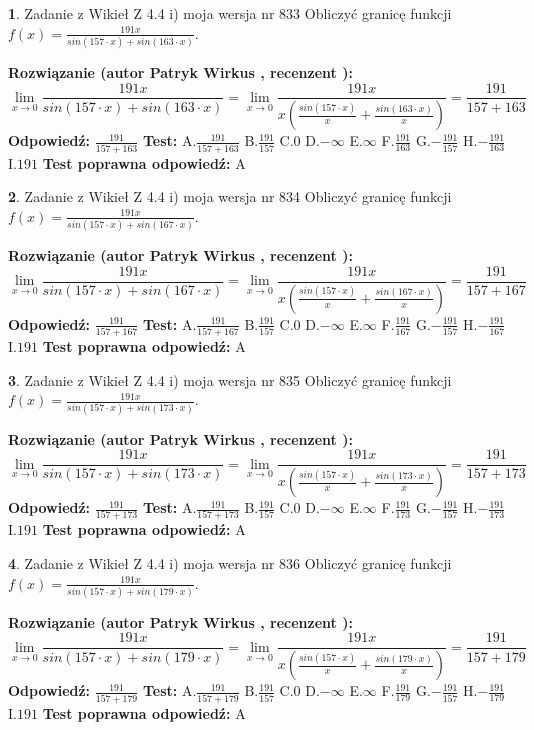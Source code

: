 \documentclass[12pt, a4paper]{article}
\theoremstyle{definition} %
\newtheorem{zad}{}
\newcommand{\zadStart}[1]{\begin{zad}#1\newline}
\newcommand{\zadStop}{\end{zad}}
\newcommand{\rozwStart}[2]{\noindent \textbf{Rozwiązanie (autor #1 , recenzent #2): }\newline}
\newcommand{\rozwStop}{\newline}
\newcommand{\odpStart}{\noindent \textbf{Odpowiedź:}\newline}
\newcommand{\odpStop}{\newline}
\newcommand{\testStart}{\noindent \textbf{Test:}\newline}
\newcommand{\testStop}{\newline}
\newcommand{\kluczStart}{\noindent \textbf{Test poprawna odpowiedź:}\newline}
\newcommand{\kluczStop}{\newline}
\begin{document}
\zadStart{Zadanie z Wikieł Z 4.4 i) moja wersja nr 833}
Obliczyć granicę funkcji $f(x)=\frac{191x}{sin(157\cdot x) +sin(163\cdot x)}$.
\zadStop
\rozwStart{Patryk Wirkus}{}
$$\lim\limits_{x\to 0}\frac{191x}{sin(157\cdot x) +sin(163\cdot x)}=\lim\limits_{x\to 0}\frac{191x}{x(\frac{sin(157\cdot x)}{x}+\frac{sin(163\cdot x)}{x})}=\frac{191}{157+163}$$
\rozwStop
\odpStart
$\frac{191}{157+163}$
\odpStop
\testStart
A.$\frac{191}{157+163}$
B.$\frac{191}{157}$
C.$0$
D.$-\infty$
E.$\infty$
F.$\frac{191}{163}$
G.$-\frac{191}{157}$
H.$-\frac{191}{163}$
I.$191$
\testStop
\kluczStart
A
\kluczStop



\zadStart{Zadanie z Wikieł Z 4.4 i) moja wersja nr 834}
Obliczyć granicę funkcji $f(x)=\frac{191x}{sin(157\cdot x) +sin(167\cdot x)}$.
\zadStop
\rozwStart{Patryk Wirkus}{}
$$\lim\limits_{x\to 0}\frac{191x}{sin(157\cdot x) +sin(167\cdot x)}=\lim\limits_{x\to 0}\frac{191x}{x(\frac{sin(157\cdot x)}{x}+\frac{sin(167\cdot x)}{x})}=\frac{191}{157+167}$$
\rozwStop
\odpStart
$\frac{191}{157+167}$
\odpStop
\testStart
A.$\frac{191}{157+167}$
B.$\frac{191}{157}$
C.$0$
D.$-\infty$
E.$\infty$
F.$\frac{191}{167}$
G.$-\frac{191}{157}$
H.$-\frac{191}{167}$
I.$191$
\testStop
\kluczStart
A
\kluczStop



\zadStart{Zadanie z Wikieł Z 4.4 i) moja wersja nr 835}
Obliczyć granicę funkcji $f(x)=\frac{191x}{sin(157\cdot x) +sin(173\cdot x)}$.
\zadStop
\rozwStart{Patryk Wirkus}{}
$$\lim\limits_{x\to 0}\frac{191x}{sin(157\cdot x) +sin(173\cdot x)}=\lim\limits_{x\to 0}\frac{191x}{x(\frac{sin(157\cdot x)}{x}+\frac{sin(173\cdot x)}{x})}=\frac{191}{157+173}$$
\rozwStop
\odpStart
$\frac{191}{157+173}$
\odpStop
\testStart
A.$\frac{191}{157+173}$
B.$\frac{191}{157}$
C.$0$
D.$-\infty$
E.$\infty$
F.$\frac{191}{173}$
G.$-\frac{191}{157}$
H.$-\frac{191}{173}$
I.$191$
\testStop
\kluczStart
A
\kluczStop



\zadStart{Zadanie z Wikieł Z 4.4 i) moja wersja nr 836}
Obliczyć granicę funkcji $f(x)=\frac{191x}{sin(157\cdot x) +sin(179\cdot x)}$.
\zadStop
\rozwStart{Patryk Wirkus}{}
$$\lim\limits_{x\to 0}\frac{191x}{sin(157\cdot x) +sin(179\cdot x)}=\lim\limits_{x\to 0}\frac{191x}{x(\frac{sin(157\cdot x)}{x}+\frac{sin(179\cdot x)}{x})}=\frac{191}{157+179}$$
\rozwStop
\odpStart
$\frac{191}{157+179}$
\odpStop
\testStart
A.$\frac{191}{157+179}$
B.$\frac{191}{157}$
C.$0$
D.$-\infty$
E.$\infty$
F.$\frac{191}{179}$
G.$-\frac{191}{157}$
H.$-\frac{191}{179}$
I.$191$
\testStop
\kluczStart
A
\kluczStop
\end{document}

